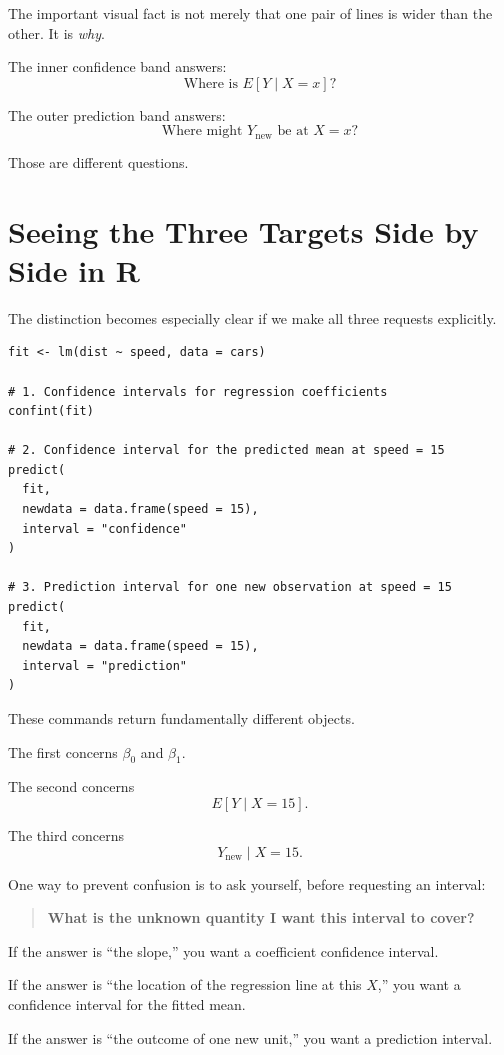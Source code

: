 \documentclass[11pt]{report}
\begin{document}
The important visual fact is not merely that one pair of lines is wider than the other. It is \emph{why}.

The inner confidence band answers:
\[
\text{Where is }E[Y\mid X=x]\text{?}
\]

The outer prediction band answers:
\[
\text{Where might }Y_{\text{new}}\text{ be at }X=x\text{?}
\]

Those are different questions.

\section{Seeing the Three Targets Side by Side in R}

The distinction becomes especially clear if we make all three requests explicitly.

\begin{lstlisting}
fit <- lm(dist ~ speed, data = cars)

# 1. Confidence intervals for regression coefficients
confint(fit)

# 2. Confidence interval for the predicted mean at speed = 15
predict(
  fit,
  newdata = data.frame(speed = 15),
  interval = "confidence"
)

# 3. Prediction interval for one new observation at speed = 15
predict(
  fit,
  newdata = data.frame(speed = 15),
  interval = "prediction"
)
\end{lstlisting}

These commands return fundamentally different objects.

The first concerns \(\beta_0\) and \(\beta_1\).

The second concerns
\[
E[Y\mid X=15].
\]

The third concerns
\[
Y_{\text{new}}\mid X=15.
\]

One way to prevent confusion is to ask yourself, before requesting an interval:

\begin{quote}
\textbf{What is the unknown quantity I want this interval to cover?}
\end{quote}

If the answer is ``the slope,'' you want a coefficient confidence interval.

If the answer is ``the location of the regression line at this \(X\),'' you want a confidence interval for the fitted mean.

If the answer is ``the outcome of one new unit,'' you want a prediction interval.
\end{document}
